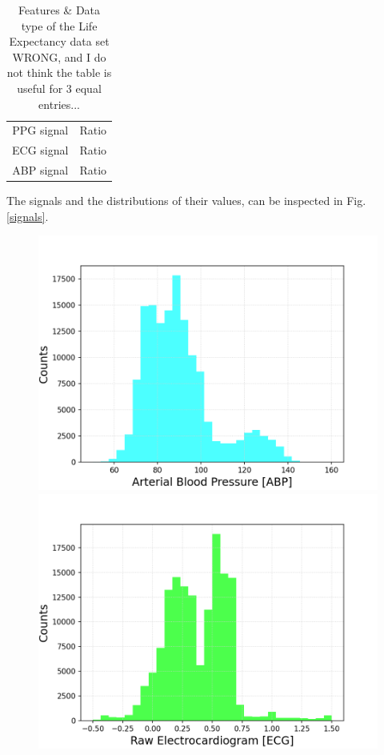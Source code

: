 \documentclass{article}
\begin{document}
\begin{table}
	\centering
	\begin{tabular}{ c c }
		\toprule
		PPG signal & Ratio \\
		ECG signal & Ratio \\
		ABP signal & Ratio \\
		\bottomrule
	\end{tabular}
	\caption{Features \& Data type of the Life Expectancy data set {\color {red} WRONG, and I do not think the table is useful for 3 equal entries... } }
	\label{tab:bloodPress}
\end{table}

The signals and the distributions of their values, can be inspected in Fig. \ref{signals}.


\begin{figure}[h!]
	\centering
	\begin{minipage}[b]{0.32\textwidth}
		\includegraphics[width=\textwidth]{plots/histo_ABP.png}

	\end{minipage}
	\begin{minipage}[b]{0.32\textwidth}
		\includegraphics[width=\textwidth]{plots/histo_ECG.png}


\end{minipage}
\end{figure}
\end{document}
